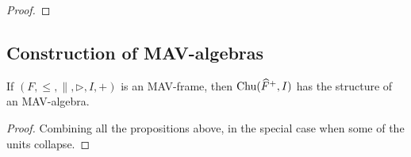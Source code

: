 \begin{proof}
\end{proof}

\subsection{Construction of MAV-algebras}

\begin{theorem}
  If $(F, \leq, \parallel, \rhd, I, +)$ is an MAV-frame, then
  $\mathrm{Chu}(\widehat{F}^+, I)$ has the structure of an MAV-algebra.
\end{theorem}

\begin{proof}
  Combining all the propositions above, in the special case when some
  of the units collapse.
\end{proof}
